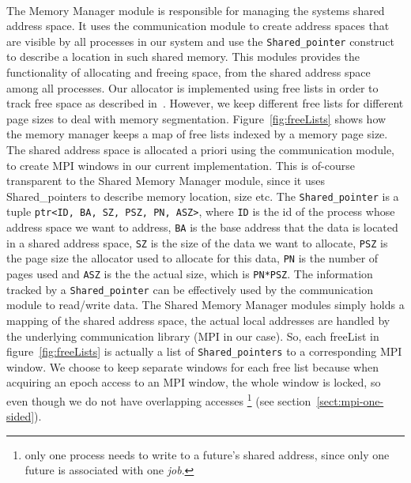 \paragraph{}
The Memory Manager module is responsible for managing the systems shared address space. 
It uses the communication module to create address spaces that
are visible by all processes in our system and use the \texttt{Shared\_pointer} construct to describe a location in such
shared memory.  This modules provides the functionality of allocating and freeing space, from the shared address 
space among all processes.  Our allocator is implemented using free lists in order to track free space as 
described in~\cite[p.~185-187]{Tanenbaum:2007:MOS:1410217}.  
However, we keep different free lists for different page sizes to deal
with memory segmentation. Figure~\ref{fig:freeLists} shows how the memory manager keeps a map of free lists
indexed by a memory page size.
The shared address space is allocated a priori
using the communication module, to create MPI windows in our current implementation.  This is of-course transparent to
the Shared Memory Manager module, since it uses Shared\_pointers to describe memory location, size etc.  
The \texttt{Shared\_pointer} is a tuple  \texttt{ptr<ID, BA, SZ, PSZ, PN, ASZ>}, where \texttt{ID} is the id of the process
whose address space we want to address, \texttt{BA} is the base address that the data is located in a shared address space,
\texttt{SZ} is the size of the data we want to allocate, \texttt{PSZ} is the page size the allocator used to allocate for this data,
\texttt{PN} is the number of pages used and \texttt{ASZ} is the the actual size, which is \texttt{PN*PSZ}.  
The information tracked by a 
\texttt{Shared\_pointer} can be effectively used by the communication module to read/write data.  The Shared Memory Manager
modules simply holds a mapping of the shared address space, the actual local addresses are handled by the 
underlying communication library (MPI in our case).   
So, each freeList in figure~\ref{fig:freeLists} is actually a list of 
\texttt{Shared\_pointers} to a corresponding MPI window.  We choose
to keep separate windows for each free list because when acquiring an epoch access to an MPI window, the whole 
window is locked, so even though we do not have overlapping accesses \footnote{only one process needs to write to a 
future's shared address, since only one future is associated with one \emph{job}.} 
(see section~\ref{sect:mpi-one-sided}).  

